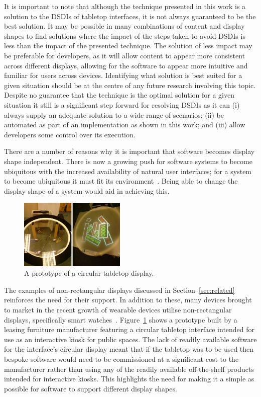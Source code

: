 \documentclass[twocolumn,compsoc]{cvm}
\begin{document}
{It is important to note that although the technique presented in this work is a solution to the \acp{DSDI} of tabletop interfaces, it is not always guaranteed to be the best solution.
It may be possible in many combinations of content and display shapes to find solutions where the impact of the steps taken to avoid \acp{DSDI} is less than the impact of the presented technique.
The solution of less impact may be preferable for developers, as it will allow content to appear more consistent across different displays, allowing for the software to appear more intuitive and familiar for users across devices.
Identifying what solution is best suited for a given situation should be at the centre of any future research involving this topic.
Despite no guarantee that the technique is the optimal solution for a given situation it still is a significant step forward for resolving \acp{DSDI} as it can (i) always supply an adequate solution to a wide-range of scenarios; (ii) be automated as part of an implementation as shown in this work; and (iii) allow developers some control over its execution.

There are a number of reasons why it is important that software becomes display shape independent.
There is now a growing push for software systems to become ubiquitous with the increased availability of natural user interfaces; for a system to become ubiquitous it must fit its environment~\cite{Greenfield2006}.
Being able to change the display shape of a system would aid in achieving this.

\begin{figure}[h!]
 \centering
   \includegraphics[width=0.45\textwidth]{figures/PrototypeTabletop.jpeg}
   \caption{A prototype of a circular tabletop display.}
   \label{fig:prototypeTabletop}
\end{figure}

The examples of non-rectangular displays discussed in Section~\ref{sec:related}  reinforces the need for their support.
In addition to these, many devices brought to market in the recent growth of wearable devices utilise non-rectangular displays, specifically smart watches~\cite{Jung2016}.
Figure~\ref{fig:prototypeTabletop} shows a prototype built by a leasing furniture manufacturer featuring a circular tabletop interface intended for use as an interactive kiosk for public spaces.
The lack of readily available software for the interface's circular display meant that if the tabletop was to be used then bespoke software would need to be commissioned at a significant cost to the manufacturer rather than using any of the readily available off-the-shelf products intended for interactive kiosks.
This highlights the need for making it a simple as possible for software to support different display shapes.

}
\end{document}
